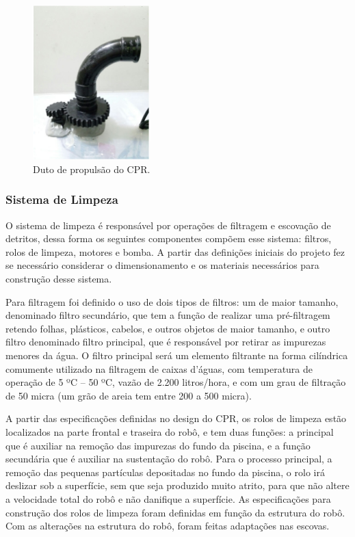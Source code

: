 \begin{figure}[h]
  \centering
  \includegraphics[width=0.4\textwidth]{figuras/duct-real.png}
  \caption{Duto de propulsão do CPR.}
  \label{fig:duct-real}
\end{figure}
\FloatBarrier

\subsubsection{Sistema de Limpeza}
O sistema de limpeza é responsável por operações de filtragem e escovação de detritos, dessa forma os seguintes componentes compõem esse sistema: filtros, rolos de limpeza, motores e bomba. A partir das definições iniciais do projeto fez se necessário considerar o dimensionamento e os materiais necessários para construção desse sistema. 

   Para filtragem foi definido o uso de  dois tipos de filtros: um de maior tamanho, denominado filtro secundário, que tem a função de realizar uma pré-filtragem retendo folhas, plásticos, cabelos, e outros objetos de maior tamanho, e outro filtro denominado filtro principal, que é responsável por retirar as impurezas menores da água. O filtro principal será um elemento filtrante na forma cilíndrica comumente utilizado na filtragem de caixas d’águas, com temperatura de operação de  5 ºC – 50 ºC, vazão de 2.200 litros/hora, e com um grau de filtração de 50 micra (um grão de areia tem entre 200 a 500 micra).

A partir das especificações definidas no design do CPR, os rolos de limpeza estão localizados na parte frontal e traseira do robô, e tem duas funções: a principal que é auxiliar na remoção das impurezas do fundo da piscina, e a função secundária que é auxiliar na sustentação do robô.
 Para o processo principal, a remoção das pequenas partículas depositadas no fundo da piscina, o rolo irá deslizar sob a superfície, sem que seja produzido muito atrito, para que não altere a velocidade total do robô e não danifique a superfície. As especificações para construção dos rolos de limpeza foram definidas em função da estrutura do robô. Com as alterações na estrutura do robô, foram feitas adaptações nas escovas.

